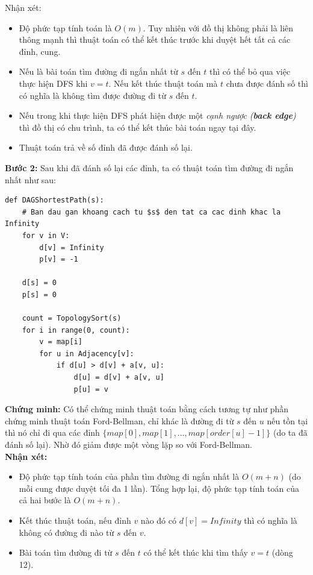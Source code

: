 \documentclass[a4paper,12pt]{report}
\begin{document}
        Nhận xét:
        \begin{itemize}
            \item Độ phức tạp tính toán là $O(m)$. Tuy nhiên với đồ thị không
                phải là liên thông mạnh thì thuật toán có thể kết thúc trước
                khi duyệt hết tất cả các đỉnh, cung.
            \item Nếu là bài toán tìm đường đi ngắn nhất từ $s$ đến $t$ thì có
                thể bỏ qua việc thực hiện DFS khi $v = t$. Nếu kết thúc thuật
                toán mà $t$ chưa được đánh số thì có nghĩa là không tìm được
                đường đi từ $s$ đến $t$.
            \item Nếu trong khi thực hiện DFS phát hiện được một \textit{cạnh ngược
                (\textbf{back edge})} thì đồ thị có chu trình, ta có thể kết
                thúc bài toán ngay tại đây.
            \item Thuật toán trả về số đỉnh đã được đánh số lại.
        \end{itemize}

        \textbf{Bước 2:} Sau khi đã đánh số lại các đỉnh, ta có thuật toán tìm
        đường đi ngắn nhất như sau:\\
        \begin{verbatim}
def DAGShortestPath(s):
    # Ban dau gan khoang cach tu $s$ den tat ca cac dinh khac la Infinity
    for v in V:
        d[v] = Infinity
        p[v] = -1
    
    d[s] = 0
    p[s] = 0

    count = TopologySort(s)
    for i in range(0, count):
        v = map[i]
        for u in Adjacency[v]:
            if d[u] > d[v] + a[v, u]:
                d[u] = d[v] + a[v, u]
                p[u] = v
        \end{verbatim}
        
        \textbf{Chứng minh:} Có thể chứng minh thuật toán bằng cách tương tự
        như phần chứng minh thuật toán Ford-Bellman, chỉ khác là đường đi từ
        $s$ đến $u$ nếu tồn tại thì nó chỉ đi qua các đỉnh $\{map[0], map[1],
        ..., map[order[u]-1]\}$ (do ta đã đánh số lại). Nhờ đó giảm được một
        vòng lặp so với Ford-Bellman.\\

        \textbf{Nhận xét:}
        \begin{itemize}
            \item Độ phức tạp tính toán của phần tìm đường đi ngắn nhất là
                $O(m+n)$ (do mỗi cung được duyệt tối đa 1 lần). Tổng hợp lại, 
                độ phức tạp tính toán của cả hai bước là $O(m+n)$.
            \item Kết thúc thuật toán, nếu đỉnh $v$ nào đó có $d[v] = Infinity$
                thì có nghĩa là không có đường đi nào từ $s$ đến $v$.
            \item Bài toán tìm đường đi từ $s$ đến $t$ có thể kết thúc khi tìm
                thấy $v = t$ (dòng 12).
        \end{itemize}
\end{document}
